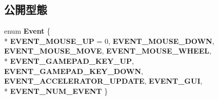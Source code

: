 \subsection*{公開型態}
\begin{DoxyCompactItemize}
\item 
enum {\bfseries Event} \{ \\*
{\bfseries E\+V\+E\+N\+T\+\_\+\+M\+O\+U\+S\+E\+\_\+\+UP} = 0, 
{\bfseries E\+V\+E\+N\+T\+\_\+\+M\+O\+U\+S\+E\+\_\+\+D\+O\+WN}, 
{\bfseries E\+V\+E\+N\+T\+\_\+\+M\+O\+U\+S\+E\+\_\+\+M\+O\+VE}, 
{\bfseries E\+V\+E\+N\+T\+\_\+\+M\+O\+U\+S\+E\+\_\+\+W\+H\+E\+EL}, 
\\*
{\bfseries E\+V\+E\+N\+T\+\_\+\+G\+A\+M\+E\+P\+A\+D\+\_\+\+K\+E\+Y\+\_\+\+UP}, 
{\bfseries E\+V\+E\+N\+T\+\_\+\+G\+A\+M\+E\+P\+A\+D\+\_\+\+K\+E\+Y\+\_\+\+D\+O\+WN}, 
{\bfseries E\+V\+E\+N\+T\+\_\+\+A\+C\+C\+E\+L\+E\+R\+A\+T\+O\+R\+\_\+\+U\+P\+D\+A\+TE}, 
{\bfseries E\+V\+E\+N\+T\+\_\+\+G\+UI}, 
\\*
{\bfseries E\+V\+E\+N\+T\+\_\+\+N\+U\+M\+\_\+\+E\+V\+E\+NT}
 \}\hypertarget{class_i_dream_sky_1_1_input_a4166082efa966a6406c4d1ef5ef5f96c}{}\label{class_i_dream_sky_1_1_input_a4166082efa966a6406c4d1ef5ef5f96c}


\end{DoxyCompactItemize}
